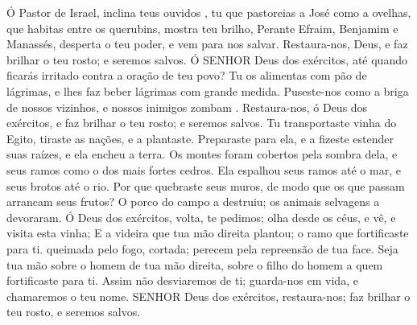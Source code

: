 {\PP 
  Ó Pastor de Israel, inclina teus ouvidos
{}, tu que pastoreias a José como a ovelhas, que habitas entre os querubins, mostra teu brilho,
  Perante Efraim, Benjamim e Manassés, desperta o teu poder, e vem para nos salvar.
  Restaura-nos, Deus, e faz brilhar o teu rosto; e
{} seremos salvos.
  Ó SENHOR Deus dos exércitos, até quando ficarás irritado contra a oração de teu povo?
  Tu os alimentas com pão de lágrimas, e lhes faz beber lágrimas com grande medida.
  Puseste-nos como a briga de nossos vizinhos, e nossos inimigos zombam
{} .
  Restaura-nos, ó Deus dos exércitos, e faz brilhar o teu rosto; e
{} seremos salvos.
  Tu transportaste
{} vinha do Egito, tiraste as nações, e a plantaste.
  Preparaste
{} para ela, e a fizeste estender suas raízes, e ela encheu a terra.
  Os montes foram cobertos pela sombra dela, e seus ramos
{} como o dos mais fortes cedros.
  Ela espalhou seus ramos até o mar, e seus brotos até o rio.
  Por que
{} quebraste seus muros, de modo que os que passam arrancam seus frutos?
  O porco do campo a destruiu; os animais selvagens a devoraram.
  Ó Deus dos exércitos, volta, te pedimos; olha desde os céus, e vê, e visita esta vinha;
  E a videira que tua mão direita plantou; o ramo que fortificaste para ti.
   queimada pelo fogo,
{} cortada; perecem pela repreensão de tua face.
  Seja tua mão sobre o homem de tua mão direita, sobre o filho do homem a quem fortificaste para ti.
  Assim não desviaremos de ti; guarda-nos em vida, e chamaremos o teu nome.
  SENHOR Deus dos exércitos, restaura-nos; faz brilhar o teu rosto, e
{} seremos salvos.
\par }


